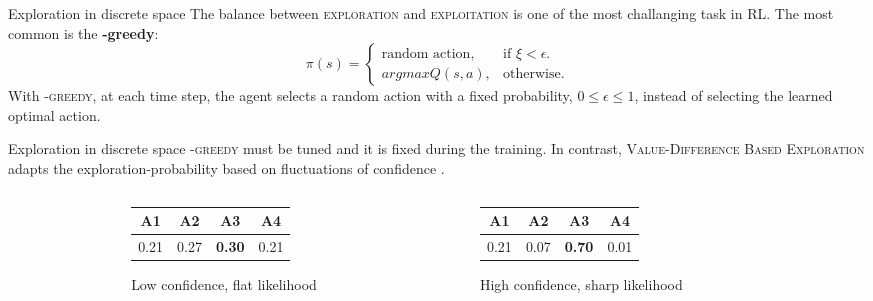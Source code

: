 \documentclass[aspectratio=169]{beamer}
\begin{document}
\begin{frame}{Exploration in discrete space}
	The balance between \textsc{exploration} and \textsc{exploitation} is one of the most challanging task in \textsc{RL}.
	The most common is the \textbf{\textepsilon-greedy}:
	\begin{equation}
  \pi(s)=\begin{cases}
    \text{random action}, & \text{if $\xi < \epsilon$}.\\
    argmax Q(s, a), & \text{otherwise}.
  \end{cases}
\end{equation}
	With \textsc{\textepsilon-greedy}, at each time step, the agent selects a random action with a fixed probability, $0 \leq \epsilon \leq 1$, instead of selecting the learned optimal action.
\end{frame}

\begin{frame}{Exploration in discrete space}
	\textsc{\textepsilon-greedy} must be tuned and it is fixed during the training. In contrast, \textsc{Value-Difference Based Exploration} adapts the exploration-probability based on fluctuations of confidence
	\cite{tokic2011value}.
	\begin{columns}
		\begin{column}{0.1\textwidth}\end{column}
		\begin{column}{0.4\textwidth}
	\begin{figure}
		\begin{tabular}{ |c|c|c|c| } 
		 \hline
			\textbf{A1} & \textbf{A2} & \textbf{A3} & \textbf{A4}  \\ [0.5ex] 
		 \hline
		 \hline
			 0.21 & 0.27 & \textbf{0.30} & 0.21 \\ 
		 \hline
		\end{tabular}
		\caption{Low confidence, flat likelihood}
	\end{figure}

		\end{column}
		\begin{column}{0.4\textwidth}
	\begin{figure}
		\begin{tabular}{ |c|c|c|c| } 
		 \hline
			\textbf{A1} & \textbf{A2} & \textbf{A3} & \textbf{A4}  \\ [0.5ex] 
		 \hline
		 \hline
			 0.21 & 0.07 & \textbf{0.70} & 0.01 \\ 
		 \hline
		\end{tabular}
		\caption{High confidence, sharp likelihood}
	\end{figure}

		\end{column}
		\begin{column}{0.1\textwidth}\end{column}
	\end{columns}
\end{frame}
\end{document}
